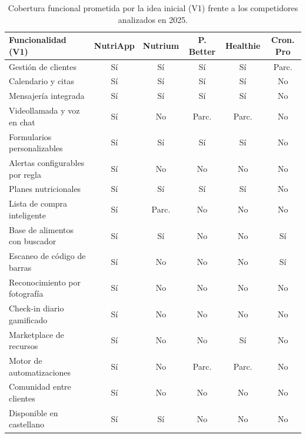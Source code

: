 \begin{table}[htbp]
\centering
\small
\setlength{\tabcolsep}{4pt}
\begin{tabular}{|>{\raggedright\arraybackslash}p{4.1cm}|c|c|c|c|c|}
\hline
\textbf{Funcionalidad (V1)} & \textbf{NutriApp} & \textbf{Nutrium} & \textbf{P. Better} & \textbf{Healthie} & \textbf{Cron. Pro} \\
\hline
Gestión de clientes              & Sí    & Sí    & Sí    & Sí    & Parc. \\
\hline
Calendario y citas               & Sí    & Sí    & Sí    & Sí    & No    \\
\hline
Mensajería integrada             & Sí    & Sí    & Sí    & Sí    & No    \\
\hline
Videollamada y voz en chat       & Sí    & No    & Parc. & Parc. & No    \\
\hline
Formularios personalizables      & Sí    & Sí    & Sí    & Sí    & No    \\
\hline
Alertas configurables por regla  & Sí    & No    & No    & No    & No    \\
\hline
Planes nutricionales             & Sí    & Sí    & Sí    & Sí    & No    \\
\hline
Lista de compra inteligente      & Sí    & Parc. & No    & No    & No    \\
\hline
Base de alimentos con buscador   & Sí    & Sí    & No    & No    & Sí    \\
\hline
Escaneo de código de barras      & Sí    & No    & No    & No    & Sí    \\
\hline
Reconocimiento por fotografía    & Sí    & No    & No    & No    & No    \\
\hline
Check-in diario gamificado       & Sí    & No    & No    & No    & No    \\
\hline
Marketplace de recursos          & Sí    & No    & No    & Sí    & No    \\
\hline
Motor de automatizaciones        & Sí    & No    & Parc. & Parc. & No    \\
\hline
Comunidad entre clientes         & Sí    & No    & No    & No    & No    \\
\hline
Disponible en castellano         & Sí    & Sí    & No    & No    & No    \\
\hline
\end{tabular}
\caption{Cobertura funcional prometida por la idea inicial (V1) frente a los competidores analizados en 2025.}
\label{tab:competidores-v1}
\end{table}
